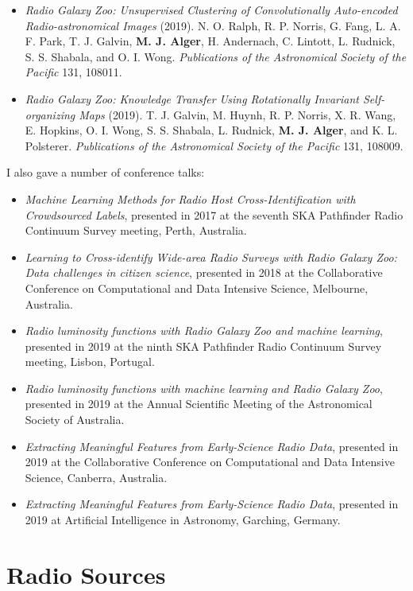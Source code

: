 \documentclass[11pt, a4paper]{book}
\begin{document}
\begin{itemize}
    \item \emph{Radio Galaxy Zoo: Unsupervised Clustering of Convolutionally Auto-encoded Radio-astronomical Images} (2019). N. O. Ralph, R. P. Norris, G. Fang, L. A. F. Park, T. J. Galvin, \textbf{M. J. Alger}, H. Andernach, C. Lintott, L. Rudnick, S. S. Shabala, and O. I. Wong. \emph{Publications of the Astronomical Society of the Pacific} 131, 108011.
    \item \emph{Radio Galaxy Zoo: Knowledge Transfer Using Rotationally Invariant Self-organizing Maps} (2019). T. J. Galvin, M. Huynh, R. P. Norris, X. R. Wang, E. Hopkins, O. I. Wong, S. S. Shabala, L. Rudnick, \textbf{M. J. Alger}, and K. L. Polsterer. \emph{Publications of the Astronomical Society of the Pacific} 131, 108009.
\end{itemize}

\newpage

I also gave a number of conference talks:
\begin{itemize}
    \item \emph{Machine Learning Methods for Radio Host Cross-Identification with Crowdsourced Labels}, presented in 2017 at the seventh SKA Pathfinder Radio Continuum Survey meeting, Perth, Australia.
    \item \emph{Learning to Cross-identify Wide-area Radio Surveys with Radio Galaxy Zoo: Data challenges in citizen science}, presented in 2018 at the Collaborative Conference on Computational and Data Intensive Science, Melbourne, Australia.
    \item \emph{Radio luminosity functions with Radio Galaxy Zoo and machine learning}, presented in 2019 at the ninth SKA Pathfinder Radio Continuum Survey meeting, Lisbon, Portugal.
    \item \emph{Radio luminosity functions with machine learning and Radio Galaxy Zoo}, presented in 2019 at the Annual Scientific Meeting of the Astronomical Society of Australia.
    \item \emph{Extracting Meaningful Features from Early-Science Radio Data}, presented in 2019 at the Collaborative Conference on Computational and Data Intensive Science, Canberra, Australia.
    \item \emph{Extracting Meaningful Features from Early-Science Radio Data}, presented in 2019 at Artificial Intelligence in Astronomy, Garching, Germany.
\end{itemize}

\chapter{Radio Sources}
\label{cha:background}
\end{document}
